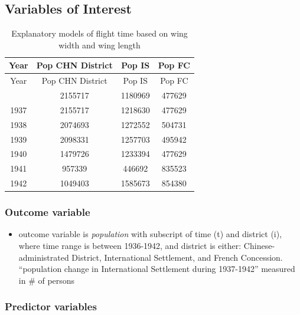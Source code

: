 \documentclass[
  letterpaper,
  DIV=11,
  numbers=noendperiod]{scrartcl}
\providecommand{\tightlist}{%
  \setlength{\itemsep}{0pt}\setlength{\parskip}{0pt}}\usepackage{longtable,booktabs,array}
\begin{document}
\hypertarget{variables-of-interest}{%
\subsection{Variables of Interest}\label{variables-of-interest}}

\hypertarget{tbl-outcome_variable}{}
\begin{longtable}[]{@{}cccc@{}}
\caption{\label{tbl-outcome_variable}Explanatory models of flight time
based on wing width and wing length}\tabularnewline
\toprule\noalign{}
Year & Pop CHN District & Pop IS & Pop FC \\
\midrule\noalign{}
\endfirsthead
\toprule\noalign{}
Year & Pop CHN District & Pop IS & Pop FC \\
\midrule\noalign{}
\endhead
\bottomrule\noalign{}
\endlastfoot
1936 & 2155717 & 1180969 & 477629 \\
1937 & 2155717 & 1218630 & 477629 \\
1938 & 2074693 & 1272552 & 504731 \\
1939 & 2098331 & 1257703 & 495942 \\
1940 & 1479726 & 1233394 & 477629 \\
1941 & 957339 & 446692 & 835523 \\
1942 & 1049403 & 1585673 & 854380 \\
\end{longtable}

\hypertarget{outcome-variable}{%
\subsubsection{Outcome variable}\label{outcome-variable}}

\begin{itemize}
\tightlist
\item
  outcome variable is \emph{population} with subscript of time (t) and
  district (i), where time range is between 1936-1942, and district is
  either: Chinese-administrated District, International Settlement, and
  French Concession. ``population change in International Settlement
  during 1937-1942'' measured in \# of persons
\end{itemize}

\hypertarget{predictor-variables}{%
\subsubsection{Predictor variables}\label{predictor-variables}}
\end{document}

